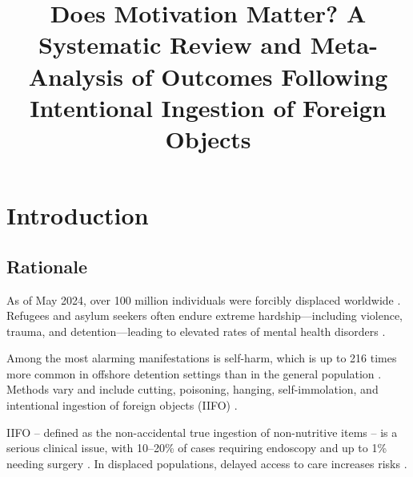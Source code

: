 \documentclass[pdflatex,sn-basic,Numbered]{sn-jnl}
\begin{document}
\title[Does Motivation Matter?]{Does Motivation Matter? A Systematic Review and Meta-Analysis of Outcomes Following Intentional Ingestion of Foreign Objects}

\author*[1]{ }
\author[1]{ }




\maketitle

\clearpage

\section{Introduction}

\subsection{Rationale}
As of May 2024, over 100 million individuals were forcibly displaced worldwide \cite{UNHCR_2022}. Refugees and asylum seekers often endure extreme hardship—including violence, trauma, and detention—leading to elevated rates of mental health disorders \cite{UNHCR_2010, AmnestyInternational_2024, Athwal_2015, Sundvall_2015, Nickerson_2019, Bevione_2024}. 

Among the most alarming manifestations is self-harm, which is up to 216 times more common in offshore detention settings than in the general population \cite{vonWerthern_2018, Hedrick_2019, GlobalDetentionProject_2024}. Methods vary and include cutting, poisoning, hanging, self-immolation, and intentional ingestion of foreign objects (IIFO) \cite{Davidson_2016, Hedrick_2019, Ajdacic-Gross_2008}.

IIFO -- defined as the non-accidental true ingestion of non-nutritive items -- is a serious clinical issue, with 10–20\% of cases requiring endoscopy and up to 1\% needing surgery \cite{Becq_2021, Ikenberry_2011, Birk_2016}. In displaced populations, delayed access to care increases risks \cite{Vujkovic_2019}. 
\end{document}
